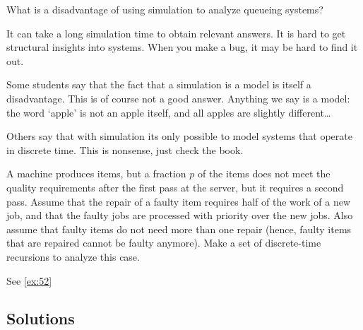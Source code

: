 \begin{exercise}[201807]
  What is a disadvantage of using simulation to analyze queueing systems?
\begin{solution}
    It can take a long simulation time to obtain relevant answers. It is hard to get structural insights into systems. When you make a bug, it may be hard to find it out.

Some students say that the fact that a simulation is a model is itself a disadvantage. This is of course not a good answer. Anything we say is a model: the word `apple' is not an apple itself, and all apples are slightly different\ldots 

Others say that with simulation its only possible to model systems that operate in discrete time. This is nonsense, just check the book. 
\end{solution}
\end{exercise}


\begin{exercise}[201904]
  A machine produces items, but a fraction $p$ of the items does not meet the quality requirements after the first pass at the server, but it requires a second pass.
  Assume that the repair of a faulty item requires half of the work of a new job, and that the faulty jobs are processed with priority over the new jobs.
  Also assume that faulty items do not need more than one repair (hence, faulty items that are repaired cannot be faulty anymore).
  Make a set of discrete-time recursions to analyze this case.
\begin{solution}
See \ref{ex:52}
\end{solution}
\end{exercise}


\subsection*{Solutions}




